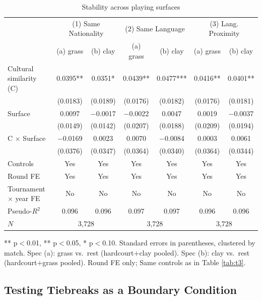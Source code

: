 \documentclass[10pt]{article}
\begin{document}
\begin{table}[htbp]
\color{blue}
\centering
\caption{Stability across playing surfaces \label{tab:t5}}
\begin{threeparttable}
\begin{tabular}{lcccccc}
\toprule
 & \multicolumn{2}{c}{(1) Same Nationality} & \multicolumn{2}{c}{(2) Same Language} & \multicolumn{2}{c}{(3) Lang. Proximity} \\
 & (a) grass & (b) clay & (a) grass & (b) clay & (a) grass & (b) clay \\
\midrule
Cultural similarity (C) & 0.0395** & 0.0351* & 0.0439** & 0.0477*** & 0.0416** & 0.0401** \\
 & (0.0183) & (0.0189) & (0.0176) & (0.0182) & (0.0176) & (0.0181) \\
Surface & 0.0097 & $-$0.0017 & $-$0.0022 & 0.0047 & 0.0019 & $-$0.0037 \\
 & (0.0149) & (0.0142) & (0.0207) & (0.0188) & (0.0209) & (0.0194) \\
C $\times$ Surface & $-$0.0169 & 0.0023 & 0.0070 & $-$0.0084 & 0.0003 & 0.0061 \\
 & (0.0376) & (0.0347) & (0.0364) & (0.0340) & (0.0364) & (0.0344) \\
\midrule
Controls  & Yes & Yes & Yes & Yes & Yes & Yes \\
Round FE & Yes & Yes & Yes & Yes & Yes & Yes \\
Tournament $\times$ year FE & No & No & No & No & No & No \\
Pseudo-$R^2$ & 0.096 & 0.096 & 0.097 & 0.097 & 0.096 & 0.096 \\
$N$ & \multicolumn{2}{c}{3,728} & \multicolumn{2}{c}{3,728} & \multicolumn{2}{c}{3,728} \\
\bottomrule
\end{tabular}
\begin{tablenotes}
\small
\item *** p$<$0.01, ** p$<$0.05, * p$<$0.10. Standard errors in parentheses, clustered by match. Spec (a): grass vs.\ rest (hardcourt+clay pooled). Spec (b): clay vs.\ rest (hardcourt+grass pooled). Round FE only; Same controls as in  Table \ref{tab:t3}. 
\end{tablenotes}
\end{threeparttable}
\end{table}
\FloatBarrier

\subsection{Testing Tiebreaks as a Boundary Condition} 
\end{document}
